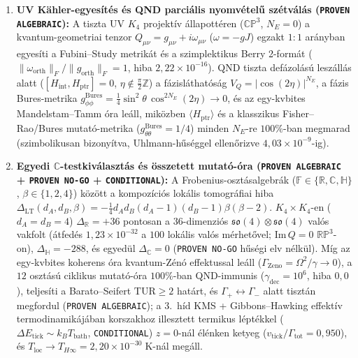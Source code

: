 \documentclass[11pt,a4paper]{article}
\begin{document}
\begin{enumerate}\setlength{\itemsep}{2pt}
\item \textbf{UV K\"ahler-egyesítés és QND parciális nyomvételű szétválás (\texttt{PROVEN ALGEBRAIC}):} A tiszta UV $K_4$ projektív állapottéren ($\mathbb{CP}^3$, $N_E=0$) a kvantum-geometriai tenzor $Q_{\mu\nu} = g_{\mu\nu} + i\omega_{\mu\nu}$ ($\omega = -g J$) egzakt $1:1$ arányban egyesíti a Fubini--Study metrikát és a szimplektikus Berry 2-formát ($\|\omega_{\mathrm{orth}}\|_F/\|g_{\mathrm{orth}}\|_F = 1$, hiba $2{,}22\times 10^{-16}$). QND tiszta defázolású leszállás alatt ($[H_{\mathrm{int}}, H_{\mathrm{ptr}}]=0$, $\eta \notin \frac{\pi}{2}\mathbb{Z}$) a fázisláthatóság $V_Q = |\cos(2\eta)|^{N_E}$, a fázis Bures-metrika $g_{\phi\phi}^{\mathrm{Bures}} = \frac{1}{4}\sin^2\theta\,\cos^{2N_E}(2\eta)\to 0$, és az egy-kvbites Mandelstam--Tamm óra leáll, miközben $\langle H_{\mathrm{ptr}}\rangle$ és a klasszikus Fisher--Rao/Bures mutató-metrika ($g_{\theta\theta}^{\mathrm{Bures}} = 1/4$) minden $N_E$-re $100\%$-ban megmarad (szimbolikusan bizonyítva, Uhlmann-hűséggel ellenőrizve $4{,}03\times 10^{-9}$-ig).
\item \textbf{Egyedi $\mathbb{C}$-testkiválasztás és összetett mutató-óra (\texttt{PROVEN ALGEBRAIC} + \texttt{PROVEN NO-GO} + \texttt{CONDITIONAL}):} A Frobenius-osztásalgebrák ($\mathbb{F}\in\{\mathbb{R},\mathbb{C},\mathbb{H}\}$, $\beta\in\{1,2,4\}$) között a kompozíciós lokális tomográfiai hiba $\Delta_{\mathrm{LT}}(d_A,d_B,\beta) = -\frac{1}{4}d_A d_B(d_A-1)(d_B-1)\beta(\beta-2)$. $K_4\times K_4$-en ($d_A=d_B=4$) $\Delta_{\mathbb{R}} = +36$ pontosan a $36$-dimenziós $\mathfrak{so}(4)\otimes\mathfrak{so}(4)$ valós vakfolt (átfedés $1{,}23\times 10^{-32}$ a $100$ lokális valós mérhetővel; $\mathrm{Im}\,Q=0$ $\mathbb{RP}^3$-on), $\Delta_{\mathbb{H}}=-288$, és egyedül $\Delta_{\mathbb{C}}=0$ (\texttt{PROVEN NO-GO} hűségi elv nélkül). Míg az egy-kvbites koherens óra kvantum-Zénó effektussal leáll ($\Gamma_{\mathrm{Zeno}}=\Omega^2/\gamma\to 0$), a $12$ osztású ciklikus mutató-óra $100\%$-ban QND-immunis ($\gamma_{\mathrm{dec}}=10^6$, hiba $0{,}0$), teljesíti a Barato--Seifert $\mathrm{TUR}\ge 2$ határt, és $\Gamma_+\leftrightarrow\Gamma_-$ alatt tisztán megfordul (\texttt{PROVEN ALGEBRAIC}); a 3.~híd KMS + Gibbons--Hawking effektív termodinamikájában korszakhoz illesztett termikus léptékkel ($\Delta E_{\mathrm{tick}}\sim k_B T_{\mathrm{bath}}$, \texttt{CONDITIONAL}) $z=0$-nál élénken ketyeg ($v_{\mathrm{tick}}/\Gamma_{\mathrm{tot}}=0{,}950$), és $T_{\mathrm{loc}}\to T_{H\infty}=2{,}20\times 10^{-30}\;\mathrm{K}$-nál megáll.

\end{enumerate}
\end{document}
